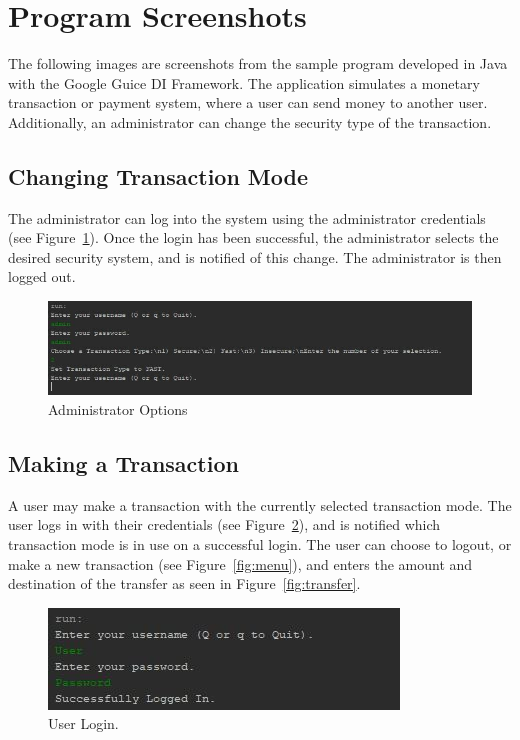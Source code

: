 \documentclass[12pt,twocolumn]{IEEEtran}
\begin{document}
\section{Program Screenshots} \label{app:screenshots}
\setcounter{figure}{0}  
\setcounter{equation}{0} 
\setcounter{table}{0}

The following images are screenshots from the sample program developed in Java with the Google Guice DI Framework. The application simulates a monetary transaction or payment system, where a user can send money to another user. Additionally, an administrator can change the security type of the transaction.

\subsection{Changing Transaction Mode}

The administrator can log into the system using the administrator credentials (see Figure~\ref{fig:admin}). Once the login has been successful, the administrator selects the desired security system, and is notified of this change. The administrator is then logged out.

\begin{figure}[h!]
	\centering
	\includegraphics[width=0.6\linewidth]{./Resources/cli-admin.jpg}
	\caption{Administrator Options} \label{fig:admin}
\end{figure}

\subsection{Making a Transaction}

A user may make a transaction with the currently selected transaction mode. The user logs in with their credentials (see Figure~\ref{fig:userCreds}), and is notified which transaction mode is in use on a successful login. The user can choose to logout, or make a new transaction (see Figure~\ref{fig:menu}), and enters the amount and destination of the transfer as seen in Figure~\ref{fig:transfer}.

\begin{figure}[h!]
	\centering
	\includegraphics[width=0.4\linewidth]{./Resources/cli-login.jpg}
	\caption{User Login.} \label{fig:userCreds}
\end{figure}
\end{document}
